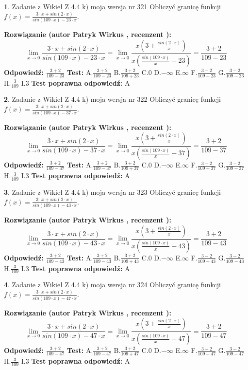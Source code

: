 \documentclass[12pt, a4paper]{article}
\theoremstyle{definition} %
\newtheorem{zad}{}
\newcommand{\zadStart}[1]{\begin{zad}#1\newline}
\newcommand{\zadStop}{\end{zad}}
\newcommand{\rozwStart}[2]{\noindent \textbf{Rozwiązanie (autor #1 , recenzent #2): }\newline}
\newcommand{\rozwStop}{\newline}
\newcommand{\odpStart}{\noindent \textbf{Odpowiedź:}\newline}
\newcommand{\odpStop}{\newline}
\newcommand{\testStart}{\noindent \textbf{Test:}\newline}
\newcommand{\testStop}{\newline}
\newcommand{\kluczStart}{\noindent \textbf{Test poprawna odpowiedź:}\newline}
\newcommand{\kluczStop}{\newline}
\begin{document}
\zadStart{Zadanie z Wikieł Z 4.4 k) moja wersja nr 321}
Obliczyć granicę funkcji $f(x)=\frac{3\cdot x +sin(2\cdot x)}{sin(109\cdot x) -23\cdot x}$.
\zadStop
\rozwStart{Patryk Wirkus}{}
$$\lim\limits_{x\to 0}\frac{3\cdot x +sin(2\cdot x)}{sin(109\cdot x) -23\cdot x}
=\lim\limits_{x\to 0}\frac{x(3+\frac{sin(2\cdot x)}{x})}{x(\frac{sin(109\cdot x)}{x}-23)}
=\frac{3+2}{109-23}$$
\rozwStop
\odpStart
$\frac{3+2}{109-23}$
\odpStop
\testStart
A.$\frac{3+2}{109-23}$
B.$\frac{3+2}{109+23}$
C.$0$
D.$-\infty$
E.$\infty$
F.$\frac{3-2}{109+23}$
G.$\frac{3-2}{109-23}$
H.$\frac{3}{109}$
I.$3$
\testStop
\kluczStart
A
\kluczStop



\zadStart{Zadanie z Wikieł Z 4.4 k) moja wersja nr 322}
Obliczyć granicę funkcji $f(x)=\frac{3\cdot x +sin(2\cdot x)}{sin(109\cdot x) -37\cdot x}$.
\zadStop
\rozwStart{Patryk Wirkus}{}
$$\lim\limits_{x\to 0}\frac{3\cdot x +sin(2\cdot x)}{sin(109\cdot x) -37\cdot x}
=\lim\limits_{x\to 0}\frac{x(3+\frac{sin(2\cdot x)}{x})}{x(\frac{sin(109\cdot x)}{x}-37)}
=\frac{3+2}{109-37}$$
\rozwStop
\odpStart
$\frac{3+2}{109-37}$
\odpStop
\testStart
A.$\frac{3+2}{109-37}$
B.$\frac{3+2}{109+37}$
C.$0$
D.$-\infty$
E.$\infty$
F.$\frac{3-2}{109+37}$
G.$\frac{3-2}{109-37}$
H.$\frac{3}{109}$
I.$3$
\testStop
\kluczStart
A
\kluczStop



\zadStart{Zadanie z Wikieł Z 4.4 k) moja wersja nr 323}
Obliczyć granicę funkcji $f(x)=\frac{3\cdot x +sin(2\cdot x)}{sin(109\cdot x) -43\cdot x}$.
\zadStop
\rozwStart{Patryk Wirkus}{}
$$\lim\limits_{x\to 0}\frac{3\cdot x +sin(2\cdot x)}{sin(109\cdot x) -43\cdot x}
=\lim\limits_{x\to 0}\frac{x(3+\frac{sin(2\cdot x)}{x})}{x(\frac{sin(109\cdot x)}{x}-43)}
=\frac{3+2}{109-43}$$
\rozwStop
\odpStart
$\frac{3+2}{109-43}$
\odpStop
\testStart
A.$\frac{3+2}{109-43}$
B.$\frac{3+2}{109+43}$
C.$0$
D.$-\infty$
E.$\infty$
F.$\frac{3-2}{109+43}$
G.$\frac{3-2}{109-43}$
H.$\frac{3}{109}$
I.$3$
\testStop
\kluczStart
A
\kluczStop



\zadStart{Zadanie z Wikieł Z 4.4 k) moja wersja nr 324}
Obliczyć granicę funkcji $f(x)=\frac{3\cdot x +sin(2\cdot x)}{sin(109\cdot x) -47\cdot x}$.
\zadStop
\rozwStart{Patryk Wirkus}{}
$$\lim\limits_{x\to 0}\frac{3\cdot x +sin(2\cdot x)}{sin(109\cdot x) -47\cdot x}
=\lim\limits_{x\to 0}\frac{x(3+\frac{sin(2\cdot x)}{x})}{x(\frac{sin(109\cdot x)}{x}-47)}
=\frac{3+2}{109-47}$$
\rozwStop
\odpStart
$\frac{3+2}{109-47}$
\odpStop
\testStart
A.$\frac{3+2}{109-47}$
B.$\frac{3+2}{109+47}$
C.$0$
D.$-\infty$
E.$\infty$
F.$\frac{3-2}{109+47}$
G.$\frac{3-2}{109-47}$
H.$\frac{3}{109}$
I.$3$
\testStop
\kluczStart
A
\kluczStop
\end{document}
